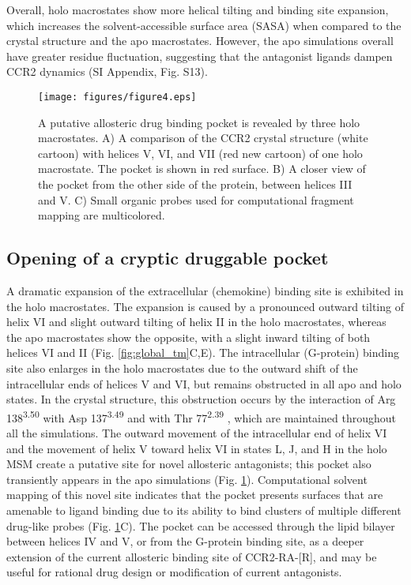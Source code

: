 Overall, holo macrostates show more helical tilting and binding site expansion, which increases the solvent-accessible surface area (SASA) when compared to the crystal structure and the apo macrostates.
However, the apo simulations overall have greater residue fluctuation, suggesting that the antagonist ligands dampen CCR2 dynamics (SI Appendix, Fig. S13).

\begin{figure}[ht]
\centering
\texttt{[image: figures/figure4.eps]}
\caption{A putative allosteric drug binding pocket is revealed by three holo macrostates. A) A comparison of the CCR2 crystal structure (white cartoon) with helices V, VI, and VII (red new cartoon) of one holo macrostate. The pocket is shown in red surface. B) A closer view of the pocket from the other side of the protein, between helices III and V. C) Small organic probes used for computational fragment mapping are multicolored.}
\label{fig:allo_pkt}
\end{figure}

\subsection{\textbf{Opening of a cryptic druggable pocket}}

A dramatic expansion of the extracellular (chemokine) binding site is exhibited in the holo macrostates.
The expansion is caused by a pronounced outward tilting of helix VI and slight outward tilting of helix II in the holo macrostates, whereas the apo macrostates show the opposite, with a slight inward tilting of both helices VI and II (Fig. \ref{fig:global_tm}C,E).
The intracellular (G-protein) binding site also enlarges in the holo macrostates due to the outward shift of the intracellular ends of helices V and VI, but remains obstructed in all apo and holo states.
In the crystal structure, this obstruction occurs by the interaction of Arg 138\textsuperscript{3.50} with Asp 137\textsuperscript{3.49} and with Thr 77\textsuperscript{2.39} \cite{Zheng2016}, which are maintained throughout all the simulations.
The outward movement of the intracellular end of helix VI and the movement of helix V toward helix VI in states L, J, and H in the holo MSM create a putative site for novel allosteric antagonists; this pocket also transiently appears in the apo simulations (Fig. \ref{fig:allo_pkt}).
Computational solvent mapping\cite{Kozakov2015} of this novel site indicates that the pocket presents surfaces that are amenable to ligand binding due to its ability to bind clusters of multiple different drug-like probes (Fig. \ref{fig:allo_pkt}C).
The pocket can be accessed through the lipid bilayer between helices IV and V, or from the G-protein binding site, as a deeper extension of the current allosteric binding site of CCR2-RA-[R], and may be useful for rational drug design or modification of current antagonists.

